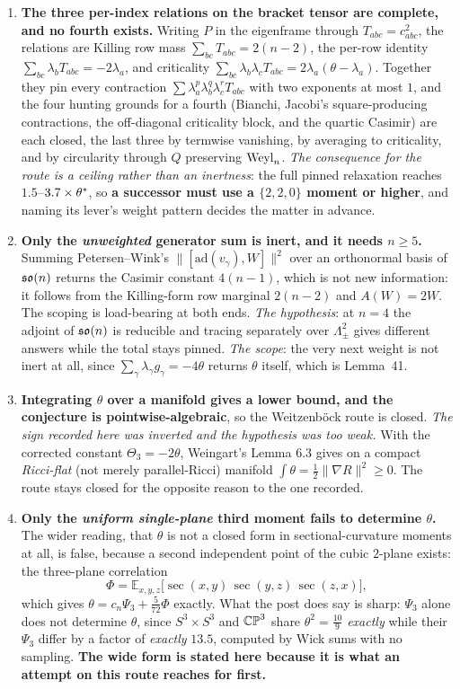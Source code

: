 \begin{enumerate}[leftmargin=1.8em]
\item \textbf{The three per-index relations on the bracket tensor are complete, and no fourth exists.} Writing $P$ in the eigenframe through $T_{abc}=c_{abc}^2$, the relations are Killing row mass $\sum_{bc}T_{abc}=2(n-2)$, the per-row identity $\sum_{bc}\lambda_bT_{abc}=-2\lambda_a$, and criticality $\sum_{bc}\lambda_b\lambda_cT_{abc}=2\lambda_a(\theta-\lambda_a)$. Together they pin every contraction $\sum\lambda_a^p\lambda_b^q\lambda_c^r T_{abc}$ with two exponents at most $1$, and the four hunting grounds for a fourth (Bianchi, Jacobi's square-producing contractions, the off-diagonal criticality block, and the quartic Casimir) are each closed, the last three by termwise vanishing, by averaging to criticality, and by circularity through $Q$ preserving $\mathrm{Weyl}_n$. \emph{The consequence for the route is a ceiling rather than an inertness}: the full pinned relaxation reaches $1.5$--$3.7\times\theta^{*}$, so \textbf{a successor must use a $\{2,2,0\}$ moment or higher}, and naming its lever's weight pattern decides the matter in advance.

\item \textbf{Only the \emph{unweighted} generator sum is inert, and it needs $n\ge5$.} Summing Petersen--Wink's $\lVert[\mathrm{ad}(v_\gamma),W]\rVert^2$ over an orthonormal basis of $\mathfrak{so}(n)$ returns the Casimir constant $4(n-1)$, which is not new information: it follows from the Killing-form row marginal $2(n-2)$ and $A(W)=2W$. The scoping is load-bearing at both ends. \emph{The hypothesis}: at $n=4$ the adjoint of $\mathfrak{so}(n)$ is reducible and tracing separately over $\Lambda^2_\pm$ gives different answers while the total stays pinned. \emph{The scope}: the very next weight is not inert at all, since $\sum_\gamma\lambda_\gamma g_\gamma=-4\theta$ returns $\theta$ itself, which is Lemma~41.

\item \textbf{Integrating $\theta$ over a manifold gives a lower bound, and the conjecture is pointwise-algebraic}, so the Weitzenb\"ock route is closed. \emph{The sign recorded here was inverted and the hypothesis was too weak.} With the corrected constant $\Theta_3=-2\theta$, Weingart's Lemma 6.3 gives on a compact \emph{Ricci-flat} (not merely parallel-Ricci) manifold $\int\theta=\tfrac12\lVert\nabla R\rVert^2\ge0$. The route stays closed for the opposite reason to the one recorded.

\item \textbf{Only the \emph{uniform single-plane} third moment fails to determine $\theta$.} The wider reading, that $\theta$ is not a closed form in sectional-curvature moments at all, is false, because a second independent point of the cubic $2$-plane exists: the three-plane correlation
\[
\Phi=\mathbb E_{x,y,z}\big[\sec(x,y)\,\sec(y,z)\,\sec(z,x)\big],
\]
which gives $\theta=c_n\Psi_3+\tfrac5{72}\Phi$ exactly. What the post does say is sharp: $\Psi_3$ alone does not determine $\theta$, since $S^3\times S^3$ and $\mathbb{CP}^3$ share $\theta^2=\tfrac{10}9$ \emph{exactly} while their $\Psi_3$ differ by a factor of \emph{exactly} $13.5$, computed by Wick sums with no sampling. \textbf{The wide form is stated here because it is what an attempt on this route reaches for first.}


\end{enumerate}

